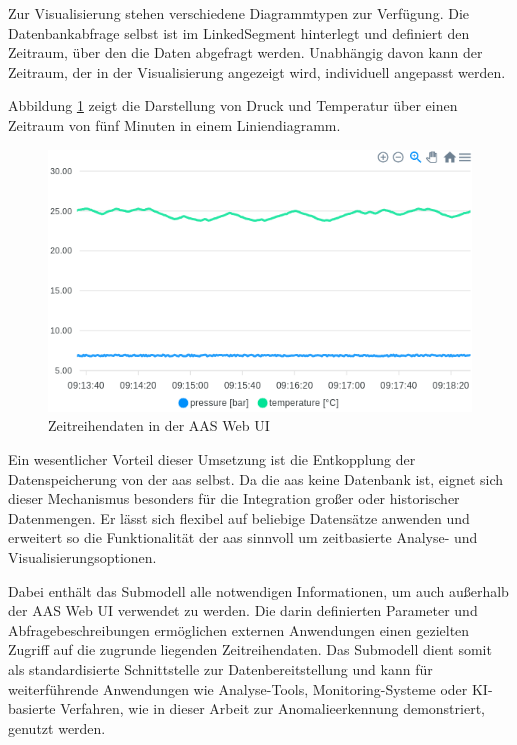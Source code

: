 Zur Visualisierung stehen verschiedene Diagrammtypen zur Verfügung. 
Die Datenbankabfrage selbst ist im LinkedSegment hinterlegt und definiert den Zeitraum, über den die Daten abgefragt werden.
Unabhängig davon kann der Zeitraum, der in der Visualisierung angezeigt wird, individuell angepasst werden.

Abbildung \ref{fig:LiniendiagrammBaSyx} zeigt die Darstellung von Druck und Temperatur über einen Zeitraum von fünf Minuten in einem Liniendiagramm.

\begin{figure}[htbp]
    \centering
        \includegraphics{Bilder/Ergebnisse/DynamischeDaten/ZeitreihenDaten/Liniendiagramm.png}
    \caption{Zeitreihendaten in der AAS Web UI}
    \label{fig:LiniendiagrammBaSyx}
\end{figure}

Ein wesentlicher Vorteil dieser Umsetzung ist die Entkopplung der Datenspeicherung von der \acs{aas} selbst. 
Da die \acs{aas} keine Datenbank ist, eignet sich dieser Mechanismus besonders für die Integration großer oder historischer Datenmengen. 
Er lässt sich flexibel auf beliebige Datensätze anwenden und erweitert so die Funktionalität der \acs{aas} sinnvoll um zeitbasierte Analyse- und Visualisierungsoptionen.

Dabei enthält das Submodell alle notwendigen Informationen, um auch außerhalb der AAS Web UI verwendet zu werden.
Die darin definierten Parameter und Abfragebeschreibungen ermöglichen externen Anwendungen einen gezielten Zugriff auf die zugrunde liegenden Zeitreihendaten.
Das Submodell dient somit als standardisierte Schnittstelle zur Datenbereitstellung und kann für weiterführende Anwendungen wie Analyse-Tools, Monitoring-Systeme oder KI-basierte Verfahren, wie in dieser Arbeit zur Anomalieerkennung demonstriert, genutzt werden.

